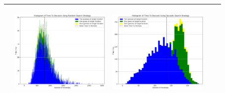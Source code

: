 \begin{landscape}
\begin{table}[h!]
\begin{tabular}{ | c | c | c | c | c |}
\begin{minipage}[c][52mm][c]{49mm}
    \end{minipage}
    &
    \begin{minipage}[c][52mm][c]{49mm}
      \includegraphics[width=49mm, height=49mm]{Chapters/MultiAgentTargetDetection/Figs/Histograms/MultipleTarget/2/2RandomHistogram.png}
    \end{minipage}
    &
    \begin{minipage}[c][52mm][c]{49mm}
      \includegraphics[width=49mm, height=49mm]{Chapters/MultiAgentTargetDetection/Figs/Histograms/MultipleTarget/2/2SaccadicHistogram.png}
    \end{minipage}
    \\
    \hline


\end{tabular}
\end{table}
\end{landscape}
